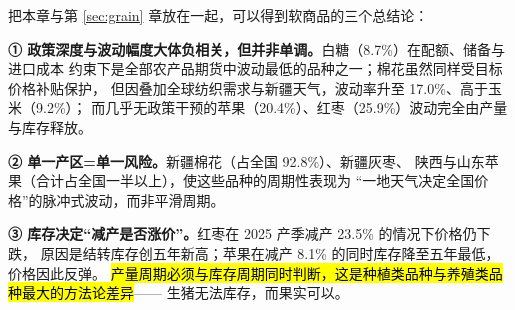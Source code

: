 把本章与第 \ref{sec:grain} 章放在一起，可以得到软商品的三个总结论：

\begin{keybox}[软商品周期的三条规律]
\normalsize
\textbf{① 政策深度与波动幅度大体负相关，但并非单调。}白糖（8.7\%）在配额、储备与进口成本
约束下是全部农产品期货中波动最低的品种之一；棉花虽然同样受目标价格补贴保护，
但因叠加全球纺织需求与新疆天气，波动率升至 \num{17.0}\%、高于玉米（9.2\%）；
而几乎无政策干预的苹果（20.4\%）、红枣（25.9\%）波动完全由产量与库存释放。
\par\vspace{3pt}
\textbf{② 单一产区=单一风险。}新疆棉花（占全国 92.8\%）、新疆灰枣、
陕西与山东苹果（合计占全国一半以上），使这些品种的周期性表现为
“一地天气决定全国价格”的脉冲式波动，而非平滑周期。
\par\vspace{3pt}
\textbf{③ 库存决定“减产是否涨价”。}红枣在 2025 产季减产 23.5\% 的情况下价格仍下跌，
原因是结转库存创五年新高；苹果在减产 8.1\% 的同时库存降至五年最低，价格因此反弹。
\hl{产量周期必须与库存周期同时判断，这是种植类品种与养殖类品种最大的方法论差异}——
生猪无法库存，而果实可以。
\end{keybox}
